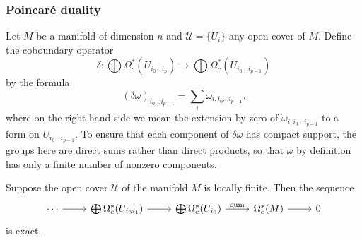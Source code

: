 \subsubsection{Poincar\'e duality}
Let $M$ be a manifold of dimension $n$ and $\mathcal{U}=\{U_i\}$ any open cover of $M$. Define the coboundary operator
\[\delta:\bigoplus\Omega^*_c(U_{i_0\dots i_p})\to\bigoplus\Omega^*_c(U_{i_0\dots i_{p-1}})\]
by the formula
\[(\delta\omega)_{i_0\dots i_{p-1}}=\sum_{i}\omega_{i,i_0\dots i_{p-1}}.\]
where on the right-hand side we mean the extension by zero of $\omega_{i,i_0\dots i_{p-1}}$ to a form on $U_{i_0\dots i_{p-1}}$. To ensure that each component of $\delta\omega$ 
has compact support, the groups here are direct sums rather than direct products, so that $\omega$ by definition has only a finite number of nonzero components.
\begin{proposition}\label{Generalized MV compact supp}
Suppose the open cover $\mathcal{U}$ of the manifold $M$ is locally finite. Then the sequence
\[\begin{tikzcd}
\cdots\ar[r]&\bigoplus\Omega^*_c(U_{i_0i_1})\ar[r]&\bigoplus\Omega^*_c(U_{i_0})\ar[r,"\text{sum}"]&\Omega^*_c(M)\ar[r]&0
\end{tikzcd}\]
is exact.
\end{proposition}

